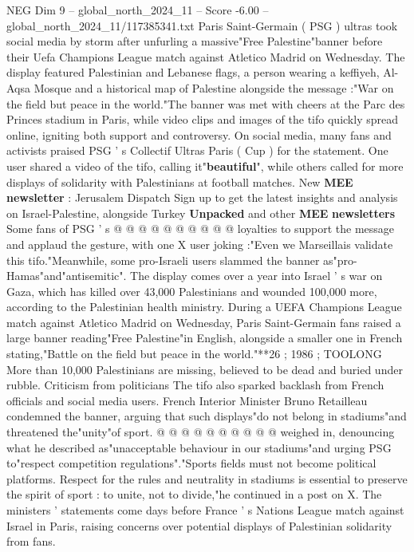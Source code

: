 \begin{textsample}{NEG Dim 9 – global\_north\_2024\_11 – Score -6.00 – global\_north\_2024\_11/117385341.txt}  \label{ex:f9_neg_047}
Paris Saint-Germain ( PSG ) ultras took social media by storm after unfurling a massive"Free Palestine"banner before their Uefa Champions League match against Atletico Madrid on Wednesday.
The display featured Palestinian and Lebanese flags, a person wearing a keffiyeh, Al-Aqsa Mosque and a historical map of Palestine alongside the message :"War on the field but peace in the world."The banner was met with cheers at the Parc des Princes stadium in Paris, while video clips and images of the tifo quickly spread online, igniting both support and controversy.
On social media, many fans and activists praised PSG ' s Collectif Ultras Paris ( Cup ) for the statement.
One user shared a video of the tifo, calling it"\textbf{beautiful}", while others called for more displays of solidarity with Palestinians at football matches.
New \textbf{MEE} \textbf{newsletter} : Jerusalem Dispatch Sign up to get the latest insights and analysis on Israel-Palestine, alongside Turkey \textbf{Unpacked} and other \textbf{MEE} \textbf{newsletters} Some fans of PSG ' s @ @ @ @ @ @ @ @ @ @ loyalties to support the message and applaud the gesture, with one X user joking :"Even we Marseillais validate this tifo."Meanwhile, some pro-Israeli users slammed the banner as"pro-Hamas"and"antisemitic".
The display comes over a year into Israel ' s war on Gaza, which has killed over 43,000 Palestinians and wounded 100,000 more, according to the Palestinian health ministry.
During a UEFA Champions League match against Atletico Madrid on Wednesday, Paris Saint-Germain fans raised a large banner reading"Free Palestine"in English, alongside a smaller one in French stating,"Battle on the field but peace in the world."**26 ; 1986 ; TOOLONG More than 10,000 Palestinians are missing, believed to be dead and buried under rubble.
Criticism from politicians The tifo also sparked backlash from French officials and social media users.
French Interior Minister Bruno Retailleau condemned the banner, arguing that such displays"do not belong in stadiums"and threatened the"unity"of sport. @ @ @ @ @ @ @ @ @ @ weighed in, denouncing what he described as"unacceptable behaviour in our stadiums"and urging PSG to"respect competition regulations"."Sports fields must not become political platforms.
Respect for the rules and neutrality in stadiums is essential to preserve the spirit of sport : to unite, not to divide,"he continued in a post on X.
The ministers ' statements come days before France ' s Nations League match against Israel in Paris, raising concerns over potential displays of Palestinian solidarity from fans.

\end{textsample}
